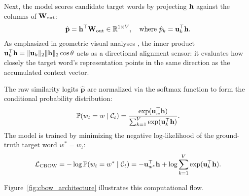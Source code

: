 \documentclass[../../../main.tex]{subfiles}
\begin{document}
Next, the model scores candidate target words by projecting $\mathbf{h}$ against the columns of $\mathbf{W}_{\text{out}}$:
\begin{equation}
\label{eq:cbow_logits}
\hat{\mathbf{p}} = \mathbf{h}^\top \mathbf{W}_{\text{out}} \in \mathbb{R}^{1 \times V}, \quad \text{where } \hat{p}_k = \mathbf{u}_k^\top \mathbf{h}.
\end{equation}
As emphasized in geometric visual analyses \cite{sanderson2024embeddings}, the inner product $\mathbf{u}_k^\top \mathbf{h} = \|\mathbf{u}_k\|_2 \|\mathbf{h}\|_2 \cos \theta$ acts as a directional alignment sensor: it evaluates how closely the target word's representation points in the same direction as the accumulated context vector.

The raw similarity logits $\hat{\mathbf{p}}$ are normalized via the softmax function to form the conditional probability distribution:
\begin{equation}
\label{eq:cbow_softmax}
\mathbb{P}(w_t = w \mid \mathcal{C}_t) = \frac{\exp(\mathbf{u}_w^\top \mathbf{h})}{\sum_{k=1}^V \exp(\mathbf{u}_k^\top \mathbf{h})}.
\end{equation}
The model is trained by minimizing the negative log-likelihood of the ground-truth target word $w^* = w_t$:
\begin{equation}
\label{eq:cbow_loss}
\mathcal{L}_{\text{CBOW}} = -\log \mathbb{P}(w_t = w^* \mid \mathcal{C}_t) = -\mathbf{u}_{w^*}^\top \mathbf{h} + \log \sum_{k=1}^V \exp(\mathbf{u}_k^\top \mathbf{h}).
\end{equation}

Figure~\ref{fig:cbow_architecture} illustrates this computational flow.
\end{document}
